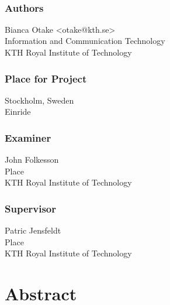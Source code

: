 \newpage
\thispagestyle{plain}
~\\
\vfill
{ 
	\subsection*{Authors}
	Bianca Otake <otake@kth.se> \\
	Information and Communication Technology\\
	KTH Royal Institute of Technology
	
	\subsection*{Place for Project}
	Stockholm, Sweden\\
	Einride
	
	\subsection*{Examiner}
	John Folkesson \\
	Place \\
	KTH Royal Institute of Technology
	
	\subsection*{Supervisor }
	Patric Jensfeldt\\
	Place\\
	KTH Royal Institute of Technology
	~
}


\newpage
\thispagestyle{plain}
\chapter*{Abstract}




